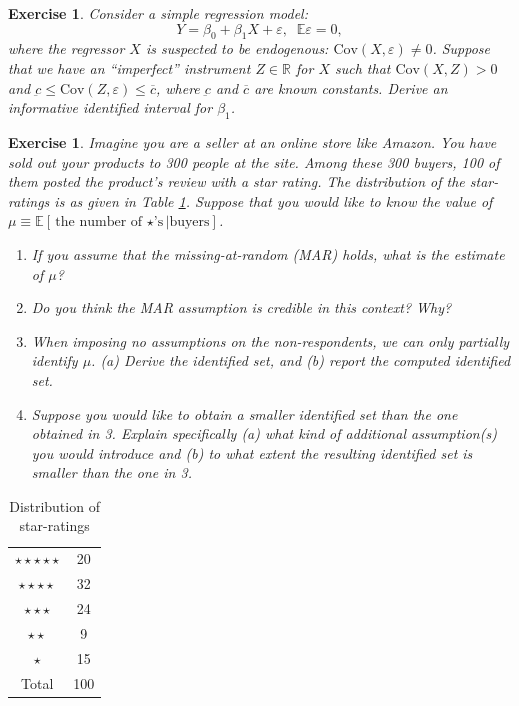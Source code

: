 \documentclass[10.5pt, A4paper, openany, uplatex]{book}
\newcommand{\mbb}{\mathbb}
\newcommand{\eps}{\varepsilon}
\newcommand{\E}{\mathbb{E}}
\newcommand{\Cov}{\mathrm{Cov}}
\renewcommand{\bar}{\overline}
\newtheorem{exercise}[theorem]{Exercise}
\numberwithin{equation}{section}
\begin{document}
\begin{framed}
\begin{exercise}\upshape
	Consider a simple regression model:
	\[
	Y = \beta_0 + \beta_1 X + \eps, \;\; \E \eps = 0,
	\]
	where the regressor $X$ is suspected to be endogenous: $\Cov(X, \eps) \neq 0$.
	Suppose that we have an ``imperfect'' instrument $Z \in \mbb{R}$ for $X$ such that $\Cov(X, Z) > 0$ and $\underbar c \le \Cov(Z,\eps) \le \bar c$, where $\underbar c$ and $\bar c$ are known constants.
	Derive an informative identified interval for $\beta_1$.
\end{exercise}

\begin{exercise}\upshape
Imagine you are a seller at an online store like Amazon.
You have sold out your products to 300 people at the site.
Among these 300 buyers, 100 of them posted the product's review with a star rating.
The distribution of the star-ratings is as given in Table \ref{table:stars}.
Suppose that you would like to know the value of $\mu \equiv \E[\text{the number of $\star$'s}|\text{buyers}]$.

\begin{enumerate}
	\item If you assume that the missing-at-random (MAR) holds, what is the estimate of $\mu$?
	\item Do you think the MAR assumption is credible in this context? Why?
	\item When imposing no assumptions on the non-respondents, we can only partially identify $\mu$.
	(a) Derive the identified set, and (b) report the computed identified set.
	\item Suppose you would like to obtain a smaller identified set than the one obtained in 3.
	Explain specifically (a) what kind of additional assumption(s) you would introduce and (b) to what extent the resulting identified set is smaller than the one in 3. 
\end{enumerate}
\end{exercise}
\end{framed}

\begin{table}[h]
	\caption{Distribution of star-ratings}\label{table:stars}
	\begin{center}
	\begin{tabular}{c|c}
	\hline
	$\star \star \star \star \star $ & 20 \\
	$\star \star \star \star $ & 32 \\
	$\star \star \star $ & 24 \\
	$\star \star $ & 9 \\
	$\star $ & 15 \\
	\hline
	Total & 100\\
	\hline
	\end{tabular}
	\end{center}
\end{table}
\end{document}
